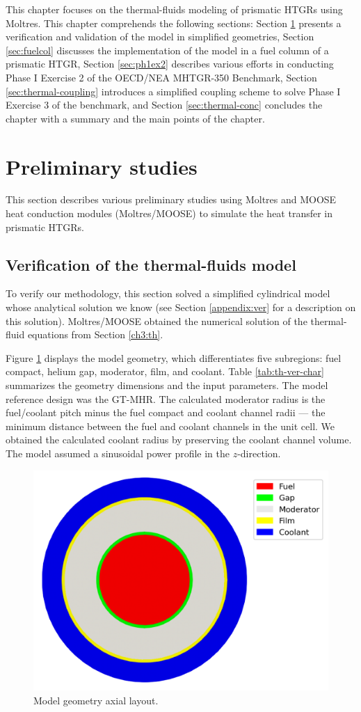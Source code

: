 \label{ch:thermalfluids}

This chapter focuses on the thermal-fluids modeling of prismatic HTGRs using Moltres.
This chapter comprehends the following sections: 
Section \ref{sec:thermal-prelim} presents a verification and validation of the model in simplified geometries,
Section \ref{sec:fuelcol} discusses the implementation of the model in a fuel column of a prismatic HTGR,
Section \ref{sec:ph1ex2} describes various efforts in conducting Phase I Exercise 2 of the OECD/NEA MHTGR-350 Benchmark, 
Section \ref{sec:thermal-coupling} introduces a simplified coupling scheme to solve Phase I Exercise 3 of the benchmark,
and Section \ref{sec:thermal-conc} concludes the chapter with a summary and the main points of the chapter.

\section{Preliminary studies}
\label{sec:thermal-prelim}

This section describes various preliminary studies using Moltres and MOOSE heat conduction modules (Moltres/MOOSE) to simulate the heat transfer in prismatic HTGRs.

\subsection{Verification of the thermal-fluids model}
\label{sec:tf-ver}

To verify our methodology, this section solved a simplified cylindrical model whose analytical solution we know (see Section \ref{appendix:ver} for a description on this solution).
Moltres/MOOSE obtained the numerical solution of the thermal-fluid equations from Section \ref{ch3:th}.

Figure \ref{fig:th-ver-mesh} displays the model geometry, which differentiates five subregions: fuel compact, helium gap, moderator, film, and coolant.
Table \ref{tab:th-ver-char} summarizes the geometry dimensions and the input parameters.
The model reference design was the GT-MHR.
The calculated moderator radius is the fuel/coolant pitch minus the fuel compact and coolant channel radii --- the minimum distance between the fuel and coolant channels in the unit cell.
We obtained the calculated coolant radius by preserving the coolant channel volume.
The model assumed a sinusoidal power profile in the $z$-direction.

\begin{figure}[htbp!]
	\centering
	\includegraphics[width=0.40\linewidth]{figures-thermal/ver-mesh2}
	\hfill
	\caption{Model geometry axial layout.}
	\label{fig:th-ver-mesh}
\end{figure}

